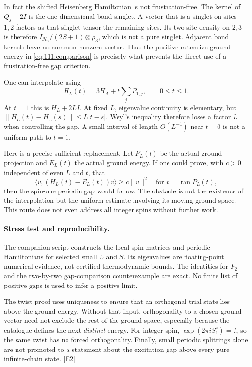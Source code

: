 \documentclass[11pt,a4paper]{article}
\newcommand{\eref}[2]{\hyperlink{extra:#1:#2}{[E#2]}}
\numberwithin{equation}{section}
\begin{document}
In fact the shifted Heisenberg Hamiltonian is not frustration-free.
The kernel of $Q_j+2I$ is the one-dimensional bond singlet. A vector that is
a singlet on sites $1,2$ factors as that singlet tensor the remaining sites.
Its two-site density on $2,3$ is therefore $I_{\mathcal H_2}/(2S+1)\otimes\rho_3$, which
is not a pure singlet. Adjacent bond kernels have no common nonzero vector.
Thus the positive extensive ground energy in
\eqref{eq:111:comparison} is precisely what prevents the direct use of a
frustration-free gap criterion.

One can interpolate using
\[
 H_L(t)=3H_A+t\sum_jP_{1,j},\qquad0\leq t\leq1.
\]
At $t=1$ this is $H_L+2LI$. At fixed $L$, eigenvalue continuity is elementary,
but $\|H_L(t)-H_L(s)\|\leq L|t-s|$. Weyl's inequality therefore loses a
factor $L$ when controlling the gap. A small interval of length $O(L^{-1})$
near $t=0$ is not a uniform path to $t=1$.

Here is a precise sufficient replacement. Let $P_L(t)$ be the actual
ground projection and $E_L(t)$ the actual ground energy. If one could prove,
with $c>0$ independent of even $L$ and $t$, that
\begin{equation}\label{eq:111:path}
 \langle v,(H_L(t)-E_L(t))v\rangle\geq c\|v\|^2
 \quad\text{for }v\perp\operatorname{ran}P_L(t),
\end{equation}
then the spin-one periodic gap would follow. The obstacle is not the
existence of the interpolation but the uniform estimate involving its
moving ground space. This route does not even address all integer spins
without further work.

\paragraph{Stress test and reproducibility.}
The companion script constructs the local spin matrices and periodic
Hamiltonians for selected small $L$ and $S$. Its eigenvalues are floating-point
numerical evidence, not certified thermodynamic bounds. The identities for
$P_2$ and the two-by-two gap-comparison counterexample are exact. No finite
list of positive gaps is used to infer a positive limit.

The twist proof uses uniqueness to ensure that an orthogonal trial state
lies above the ground energy. Without that input, orthogonality to a chosen
ground vector need not exclude the rest of the ground space, especially
because the catalogue defines the next \emph{distinct} energy. For integer
spin, $\exp(2\pi iS_1^z)=I$, so the same twist has no forced orthogonality.
Finally, small periodic splittings alone are not promoted to a statement
about the excitation gap above every pure infinite-chain state.
\eref{111}{2}
\end{document}
